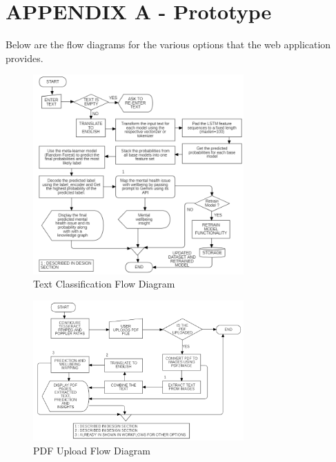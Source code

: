 

\section*{APPENDIX A - Prototype \label{sec:proto}}

\noindent
Below are the flow diagrams for the various options that the web application provides.

\begin{figure}[h!]  
    \centering
    \includegraphics[width=0.72\textwidth]{Images/APP TEXT OPTION.png}  
    \caption{Text Classification Flow Diagram}
    \label{012i}  %
\end{figure}

\begin{figure}[h!]  
    \centering
    \includegraphics[width=0.72\textwidth]{Images/APP PDF.png}  
    \caption{PDF Upload Flow Diagram}
    \label{01234i}  %
\end{figure}

